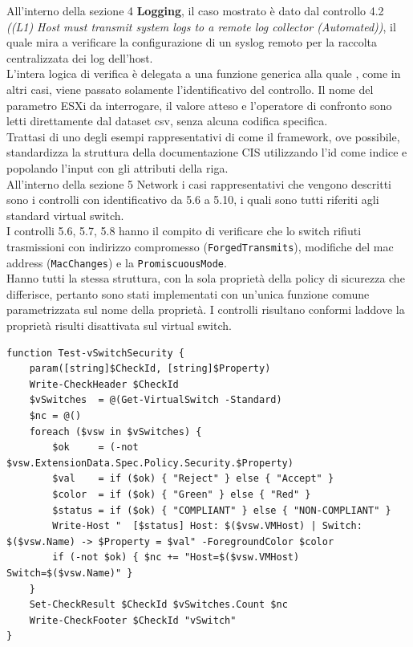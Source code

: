 \documentclass[a4paper,11pt]{report}
\begin{document}
All'interno della sezione 4 \textbf{Logging}, il caso mostrato è dato dal controllo 4.2 \textit{((L1) Host must transmit system logs to a remote log collector (Automated))}, il quale mira a verificare la configurazione di un syslog remoto per la raccolta centralizzata dei log dell'host. \\
L'intera logica di verifica è delegata a una funzione generica alla quale , come in altri casi, viene passato solamente l'identificativo del controllo. Il nome del parametro ESXi da interrogare, il valore atteso e l'operatore di confronto sono letti direttamente dal dataset csv, senza alcuna codifica specifica. \\
Trattasi di uno degli esempi rappresentativi di come il framework, ove possibile, standardizza la struttura della documentazione CIS utilizzando l'id come indice e popolando l'input con gli attributi della riga. \\


All'interno della sezione 5 Network i casi rappresentativi che vengono descritti sono i controlli con identificativo da 5.6 a 5.10, i quali sono tutti riferiti agli standard virtual switch.\\
I controlli 5.6, 5.7, 5.8 hanno il compito di verificare che lo switch rifiuti trasmissioni con indirizzo compromesso (\texttt{ForgedTransmits}), modifiche del mac address (\texttt{MacChanges}) e la \texttt{PromiscuousMode}.\\
Hanno tutti la stessa struttura, con la sola proprietà della policy di sicurezza che differisce, pertanto sono stati implementati con un'unica funzione comune parametrizzata sul nome della proprietà. I controlli risultano conformi laddove la proprietà risulti disattivata sul virtual switch.


\begin{lstlisting}[style=azcli, caption={Funzione \texttt{Test-vSwitchSecurity} per i controlli 5.6, 5.7 e 5.8}, label={lst:vswitch}]
function Test-vSwitchSecurity {
    param([string]$CheckId, [string]$Property)
    Write-CheckHeader $CheckId 
    $vSwitches  = @(Get-VirtualSwitch -Standard)
    $nc = @()
    foreach ($vsw in $vSwitches) {
        $ok     = (-not $vsw.ExtensionData.Spec.Policy.Security.$Property)
        $val    = if ($ok) { "Reject" } else { "Accept" }
        $color  = if ($ok) { "Green" } else { "Red" }
        $status = if ($ok) { "COMPLIANT" } else { "NON-COMPLIANT" }
        Write-Host "  [$status] Host: $($vsw.VMHost) | Switch: $($vsw.Name) -> $Property = $val" -ForegroundColor $color
        if (-not $ok) { $nc += "Host=$($vsw.VMHost) Switch=$($vsw.Name)" }
    }
    Set-CheckResult $CheckId $vSwitches.Count $nc
    Write-CheckFooter $CheckId "vSwitch"
}
\end{lstlisting}
\end{document}
